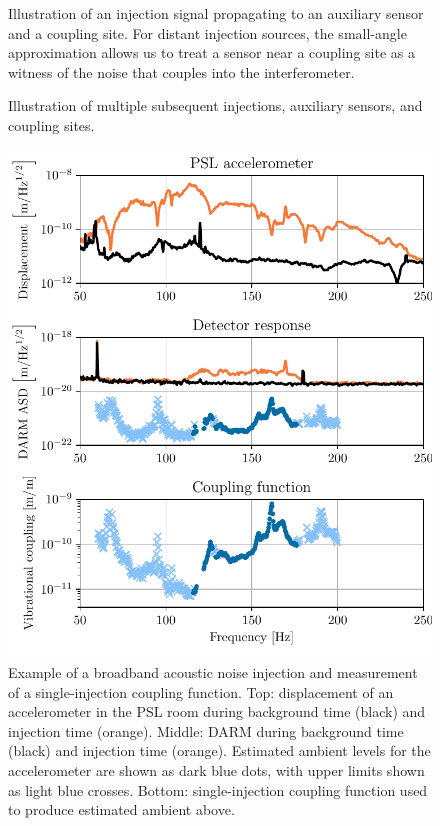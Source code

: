 \documentclass[11pt]{article}
\begin{document}
\begin{figure}
	\caption{
		Illustration of an injection signal propagating to an auxiliary sensor and a coupling site.
		For distant injection sources, the small-angle approximation allows us to treat a sensor near a coupling site as a witness of the noise that couples into the interferometer.}
	\label{fig:injection-cartoon}
\end{figure}

\begin{figure}
	\caption{
		Illustration of multiple subsequent injections, auxiliary sensors, and coupling sites.}
	\label{fig:injection-cartoon-extended}
\end{figure}

\begin{figure}
	\centering
	\includegraphics[width=\textwidth]{figures/cf-example.pdf}
	\caption{
		Example of a broadband acoustic noise injection and measurement of a single-injection coupling function.
		Top: displacement of an accelerometer in the PSL room during background time (black) and injection time (orange).
		Middle: DARM during background time (black) and injection time (orange).
		Estimated ambient levels for the accelerometer are shown as dark blue dots, with upper limits shown as light blue crosses.
		Bottom: single-injection coupling function used to produce estimated ambient above.}
	\label{fig:cf-example}
\end{figure}
\end{document}
